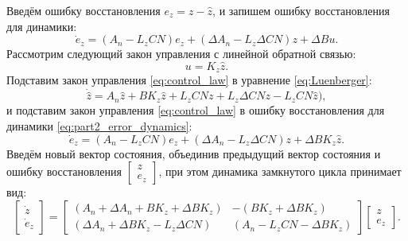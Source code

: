 Введём ошибку восстановления $e_z=z-\hat{z}$, и запишем ошибку восстановления для динамики:
%
\begin{equation}
	\label{eq:part2_error_dynamics}
	\dot{e}_z=({A}_n-{L}_z{C}{N}) e_z +(\Delta {A}_n -{L}_z\Delta {C}{N}) z +\Delta {B} u.
\end{equation}
%
Рассмотрим следующий закон управления с линейной обратной связью:
%
\begin{equation}
	\label{eq:control_law}
	u={K}_z\hat{z}.
\end{equation}
%
Подставим закон управления \ref{eq:control_law} в уравнение \ref{eq:Luenberger}:
\begin{equation}
	\label{eq:Luenberger_K}
	\dot{\hat{z}}={A}_n\hat{z}+{B}K_z \hat{z} +{L}_z C N z +{L}_z \Delta C N z- {L}_z {C} {N}\hat{z}),
\end{equation}
и подставим закон управления \ref{eq:control_law} в ошибку восстановления для динамики \ref{eq:part2_error_dynamics}:
%
\begin{equation}
	\label{eq:error_dynamics_K}
	\dot{e}_z=({A}_n-{L}_z{C}{N}) e_z +(\Delta {A}_n -{L}_z\Delta {C}{N}) z +\Delta {B} K_z \hat{z}.
\end{equation}
%
Введём новый вектор состояния, объединив предыдущий вектор состояния и ошибку восстановления $ \begin{bmatrix}
	z \\ e_z
\end{bmatrix}$, при этом динамика замкнутого цикла принимает вид:
%
\begin{equation}
	\label{eq:part2_system}
	\begin{bmatrix}
		\dot{z} \\ \dot{e}_z
	\end{bmatrix}=\begin{bmatrix}
		({A}_n+\Delta {A}_n +{B}{K}_z+\Delta {B}{K}_z) & -({B}{K}_z+\Delta {B}{K}_z) \\
		(\Delta {A}_n +\Delta {B}{K}_z-{L}_z\Delta {C}{N}) & ({A}_n-{L}_z{C}{N}-\Delta {B}{K}_z)        \end{bmatrix}\begin{bmatrix}
		z \\ e_z
	\end{bmatrix}.
\end{equation}

